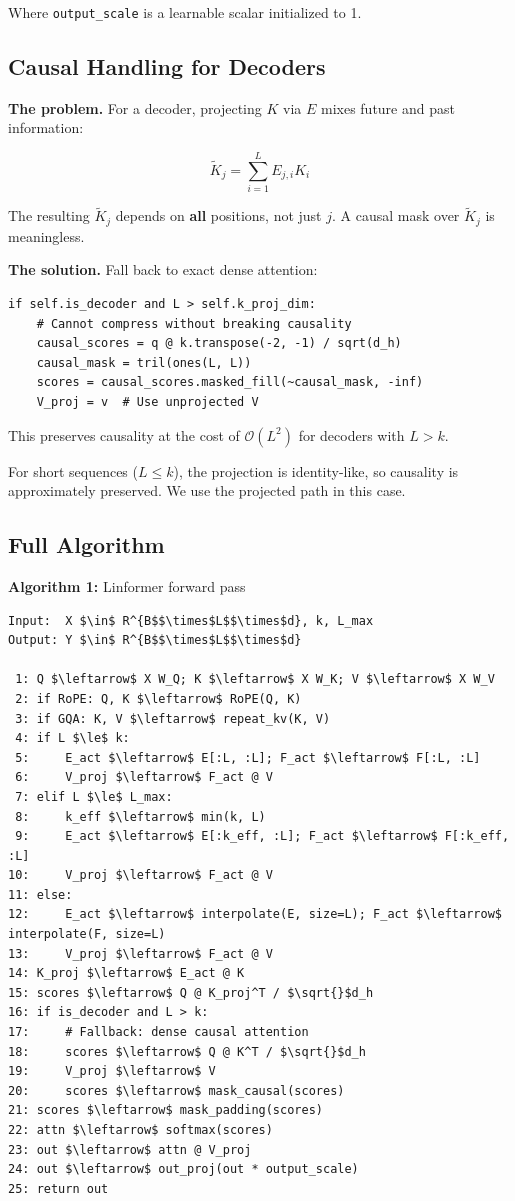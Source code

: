 Where \texttt{output\_scale} is a learnable scalar initialized to 1.

\subsection{Causal Handling for Decoders}

\textbf{The problem.} For a decoder, projecting $K$ via $E$ mixes future and past 
information:

\[
\tilde{K}_j = \sum_{i=1}^L E_{j, i} K_i
\tag{4.3}
\]

The resulting $\tilde{K}_j$ depends on \textbf{all} positions, not just $j$. A 
causal mask over $\tilde{K}_j$ is meaningless.

\textbf{The solution.} Fall back to exact dense attention:

\begin{lstlisting}
if self.is_decoder and L > self.k_proj_dim:
    # Cannot compress without breaking causality
    causal_scores = q @ k.transpose(-2, -1) / sqrt(d_h)
    causal_mask = tril(ones(L, L))
    scores = causal_scores.masked_fill(~causal_mask, -inf)
    V_proj = v  # Use unprojected V
\end{lstlisting}

This preserves causality at the cost of $\mathcal{O}(L^2)$ for decoders 
with $L > k$.

For short sequences ($L \leq k$), the projection is identity-like, so 
causality is approximately preserved. We use the projected path in this 
case.

\subsection{Full Algorithm}

\textbf{Algorithm 1:} Linformer forward pass
\begin{lstlisting}
Input:  X $\in$ R^{B$$\times$L$$\times$d}, k, L_max
Output: Y $\in$ R^{B$$\times$L$$\times$d}

 1: Q $\leftarrow$ X W_Q; K $\leftarrow$ X W_K; V $\leftarrow$ X W_V
 2: if RoPE: Q, K $\leftarrow$ RoPE(Q, K)
 3: if GQA: K, V $\leftarrow$ repeat_kv(K, V)
 4: if L $\le$ k:
 5:     E_act $\leftarrow$ E[:L, :L]; F_act $\leftarrow$ F[:L, :L]
 6:     V_proj $\leftarrow$ F_act @ V
 7: elif L $\le$ L_max:
 8:     k_eff $\leftarrow$ min(k, L)
 9:     E_act $\leftarrow$ E[:k_eff, :L]; F_act $\leftarrow$ F[:k_eff, :L]
10:     V_proj $\leftarrow$ F_act @ V
11: else:
12:     E_act $\leftarrow$ interpolate(E, size=L); F_act $\leftarrow$ interpolate(F, size=L)
13:     V_proj $\leftarrow$ F_act @ V
14: K_proj $\leftarrow$ E_act @ K
15: scores $\leftarrow$ Q @ K_proj^T / $\sqrt{}$d_h
16: if is_decoder and L > k:
17:     # Fallback: dense causal attention
18:     scores $\leftarrow$ Q @ K^T / $\sqrt{}$d_h
19:     V_proj $\leftarrow$ V
20:     scores $\leftarrow$ mask_causal(scores)
21: scores $\leftarrow$ mask_padding(scores)
22: attn $\leftarrow$ softmax(scores)
23: out $\leftarrow$ attn @ V_proj
24: out $\leftarrow$ out_proj(out * output_scale)
25: return out
\end{lstlisting}

